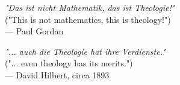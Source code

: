 \begin{flushright}
\emph{"Das ist nicht Mathematik, das ist Theologie!"} \\  
("This is not mathematics, this is theology!") \\  
 — Paul Gordan
\end{flushright}
\vspace{2em}
\begin{flushright}
\emph{"... auch die Theologie hat ihre Verdienste."} \\  
("... even theology has its merits.") \\  
 — David Hilbert, circa 1893
\end{flushright}
